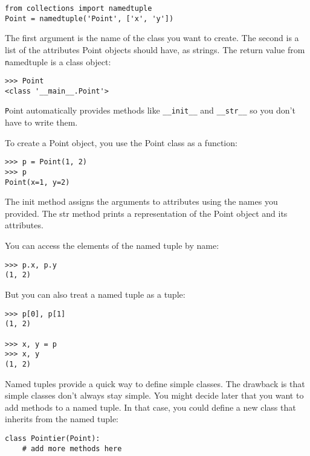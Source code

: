\documentclass[
DIV=11,
fontsize=12,
twoside,
headinclude=false,
titlepage=firstiscover,
abstract=true,
headsepline=true,
footsepline=true,
chapterprefix=true, %
headings=big,
bibliography=totoc,%
captions=tableheading
]{scrbook}
\theoremstyle{definition}
\begin{document}
\begin{lstlisting}
from collections import namedtuple
Point = namedtuple('Point', ['x', 'y'])
\end{lstlisting}

The first argument is the name of the class you want to create.
The second is a list of the attributes Point objects should have,
as strings.  The return value from {\texttt namedtuple} is a class object:

\begin{lstlisting}
>>> Point
<class '__main__.Point'>
\end{lstlisting}

{\texttt Point} automatically provides methods like \verb"__init__" and
\verb"__str__" so you don't have to write them.

To create a Point object, you use the Point class as a function:

\begin{lstlisting}
>>> p = Point(1, 2)
>>> p
Point(x=1, y=2)
\end{lstlisting}

The init method assigns the arguments to attributes using the names
you provided.  The str method prints a representation of the Point
object and its attributes.

You can access the elements of the named tuple by name:

\begin{lstlisting}
>>> p.x, p.y
(1, 2)
\end{lstlisting}

But you can also treat a named tuple as a tuple:

\begin{lstlisting}
>>> p[0], p[1]
(1, 2)

>>> x, y = p
>>> x, y
(1, 2)
\end{lstlisting}

Named tuples provide a quick way to define simple classes.
The drawback is that simple classes don't always stay simple.
You might decide later that you want to add methods to a named tuple.
In that case, you could define a new class that inherits from
the named tuple:

\begin{lstlisting}
class Pointier(Point):
    # add more methods here
\end{lstlisting}
\end{document}
